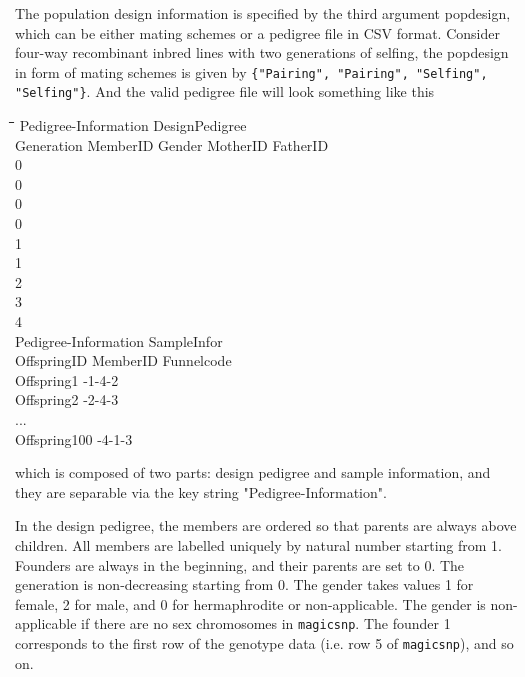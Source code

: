 \documentclass[12pt]{article}
\begin{document}
The population design information is specified by the third argument popdesign, which can be either mating schemes or a pedigree file in CSV format. Consider four-way recombinant inbred lines with two generations of selfing, the popdesign in form of mating schemes is given by \verb|{"Pairing", "Pairing", "Selfing", "Selfing"}|. And the valid pedigree file will look something like this

\begin{tabbing}
\hspace{4cm}\=\hspace{3cm}\=\hspace{2cm}\=\hspace{2cm}\=\hspace{2cm}\=\kill
Pedigree-Information \> DesignPedigree \\
Generation \>MemberID  \> Gender \> MotherID \>FatherID \\
0        \\
0        \\
0        \\
0        \\
1        \\
1        \\
2        \\
3        \\
4        \\
Pedigree-Information \> SampleInfor \\
OffspringID \>MemberID  \> Funnelcode \\
Offspring1     -1-4-2 \\
Offspring2     -2-4-3 \\
... \\
Offspring100     -4-1-3 
\end{tabbing}
which is composed of two parts:  design pedigree and sample information, and they are separable via the key string "Pedigree-Information". 

In the design pedigree, the members are ordered so that parents are always above children. All members are labelled  uniquely by natural number starting from 1. Founders are always in the beginning, and their parents are set to 0. The generation is non-decreasing starting from 0. The gender takes values 1 for female, 2 for male, and 0 for hermaphrodite or non-applicable. The gender is non-applicable if there are no sex chromosomes in \verb|magicsnp|. The founder 1 corresponds to the first row of the genotype data (i.e. row 5 of \verb|magicsnp|), and so on. 
\end{document}
